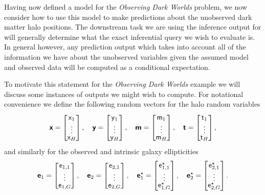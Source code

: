 Having now defined a model for the \emph{Observing Dark Worlds} problem, we now consider how to use this model to make predictions about the unobserved dark matter halo positions. The downstream task we are using the inference output for will generally determine what the exact inferential query we wish to evaluate is. In general however, any prediction output which takes into account all of the information we have about the unobserved variables given the assumed model and observed data will be computed as a conditional expectation.

To motivate this statement for the \emph{Observing Dark Worlds} example we will discuss some instances of outputs we might wish to compute. For notational convenience we define the following random vectors for the halo random variables
\begin{equation}
  \boldsymbol{\mathsf{x}} = \begin{bmatrix} \mathsf{x}_1 \\ \vdots \\[-1mm] \mathsf{x}_H \end{bmatrix},
  \quad
  \boldsymbol{\mathsf{y}} = \begin{bmatrix} \mathsf{y}_1 \\ \vdots \\[-1mm] \mathsf{y}_H \end{bmatrix},
  \quad
  \boldsymbol{\mathsf{m}} = \begin{bmatrix} \mathsf{m}_1 \\ \vdots \\[-1mm] \mathsf{m}_H \end{bmatrix},
  \quad
  \boldsymbol{\mathsf{t}} = \begin{bmatrix} \mathsf{t}_1 \\ \vdots \\[-1mm] \mathsf{t}_H \end{bmatrix},
\end{equation}
and similarly for the observed and intrinsic galaxy ellipticities
\begin{equation}
  \boldsymbol{\mathsf{e}}_1 = \begin{bmatrix} 
    \mathsf{e}_{1,1} \\ \vdots \\[-1mm] \mathsf{e}_{1,G}
  \end{bmatrix},
  \quad
  \boldsymbol{\mathsf{e}}_2 = \begin{bmatrix} 
    \mathsf{e}_{2,1} \\ \vdots \\[-1mm] \mathsf{e}_{2,G}
  \end{bmatrix},
  \quad
  \boldsymbol{\mathsf{e}}^\star_1 = \begin{bmatrix} 
    \mathsf{e}^\star_{1,1} \\ \vdots \\[-1mm] \mathsf{e}^\star_{1,G}
  \end{bmatrix},
  \quad
  \boldsymbol{\mathsf{e}}^\star_2 = \begin{bmatrix} 
    \mathsf{e}^\star_{2,1} \\ \vdots \\[-1mm] \mathsf{e}^\star_{2,G}
  \end{bmatrix}.
\end{equation}
